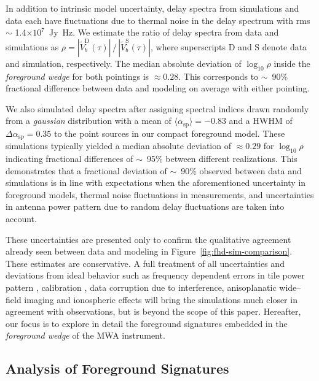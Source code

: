 \documentclass[preprint2,iop,numberedappendix,twocolappendix,appendixfloats]{emulateapj}
\begin{document}
In addition to intrinsic model uncertainty, delay spectra from simulations and data each have fluctuations due to thermal noise in the delay spectrum with rms $\sim$ 1.4$\times 10^7$~Jy~Hz. We estimate the ratio of delay spectra from data and simulations as $\rho = |\tilde{V}^\textrm{D}_b(\tau)|\,/\,|\tilde{V}^\textrm{S}_b(\tau)|$, where superscripts D and S denote data and simulation, respectively. The median absolute deviation of $\log_{10}\rho$ inside the {\it foreground wedge} for both pointings is $\approx 0.28$. This corresponds to $\sim$~90\% fractional difference between data and modeling on average with either pointing. 

We also simulated delay spectra after assigning spectral indices drawn randomly from a {\it gaussian} distribution with a mean of $\langle\alpha_\textrm{sp}\rangle=-0.83$ and a HWHM of $\Delta\alpha_\textrm{sp}=0.35$ to the point sources in our compact foreground model. These simulations typically yielded a median absolute deviation of $\approx 0.29$ for $\log_{10}\rho$ indicating fractional differences of $\sim$~95\% between different realizations. This demonstrates that a fractional deviation of $\sim$~90\% observed between data and simulations is in line with expectations when the aforementioned uncertainty in foreground models, thermal noise fluctuations in measurements, and uncertainties in antenna power pattern due to random delay fluctuations are taken into account. 

These uncertainties are presented only to confirm the qualitative agreement already seen between data and modeling in Figure~\ref{fig:fhd-sim-comparison}. These estimates are conservative. A full treatment of all uncertainties and deviations from ideal behavior such as frequency dependent errors in tile power pattern \citep{ber15}, calibration \citep{dat10}, data corruption due to interference, anisoplanatic wide--field imaging and ionospheric effects \citep{int09} will bring the simulations much closer in agreement with observations, but is beyond the scope of this paper. Hereafter, our focus is to explore in detail the foreground signatures embedded in the {\it foreground wedge} of the MWA instrument.

\subsection{Analysis of Foreground Signatures}\label{sec:FG-analysis}
\end{document}
